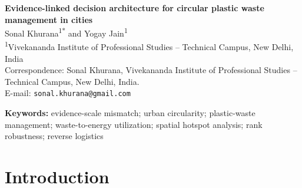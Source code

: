 \documentclass[12pt,a4paper]{article}
\begin{document}
\begin{center}
{\LARGE\bfseries Evidence-linked decision architecture for circular plastic waste management in cities}\\[1.1em]
{\large Sonal Khurana\textsuperscript{1*} and Yogay Jain\textsuperscript{1}}\\[0.55em]
{\normalsize\textsuperscript{1}Vivekananda Institute of Professional Studies -- Technical Campus, New Delhi, India}\\[0.7em]
{\small Correspondence: Sonal Khurana, Vivekananda Institute of Professional Studies -- Technical Campus, New Delhi, India.}\\
{\small E-mail: \texttt{sonal.khurana@gmail.com}}
\end{center}

\vspace{1em}

\begin{abstract}
Existing urban plastic and circularity assessments often combine evidence reported at different spatial, material, and operational scales. That practice can turn composition into recovery, city processing into capacity, or high local burden into a hotspot without testing whether those interpretations are supported. An evidence-linked architecture is developed that keeps locality composition, spatial association, city processing, facility utilization, and intervention feasibility as separate evidence objects, and that subjects locality priorities to specification testing. Delhi National Capital Territory is the empirical demonstration, not a claim of universal proof. Across 58 complete-resin localities, burden reaches 30.49\% at Kamla Nehru Ridge and 30.25\% at Kashmere Gate ISBT, yet the only significant high--high clusters are Kamla Nagar Market and Tis Hazari Court; 858 of 1,117 TPD plastic is processed (76.81\%); plant use spans 58.3--108.4\%; mean Spearman $\rho=0.893$ with 83.3\% top-10 overlap, yet only three of 58 ranks survive the robustness gate. The Delhi case shows that urban circularity decisions should be licensed by evidence type and robustness rather than by a single citywide circularity score.
\end{abstract}

\noindent\textbf{Keywords:} evidence-scale mismatch; urban circularity; plastic-waste management; waste-to-energy utilization; spatial hotspot analysis; rank robustness; reverse logistics

\section{Introduction}
\label{sec:introduction}
\end{document}
